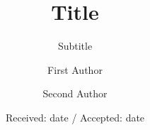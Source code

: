 \documentclass[twocolumn,epjc3]{svjour3}
\title{Title\thanksref{title}}
\subtitle{Subtitle}
\institute{First address \label{address1} \and Second address \label{address2} \and \emph{Present Address:} if needed\label{address3}}
\date{Received: date / Accepted: date}
\begin{document}
\author{First Author \and Second Author}

\maketitle

\begin{abstract}
\blindtext
\end{abstract}

\blindmathpaper
\end{document}
